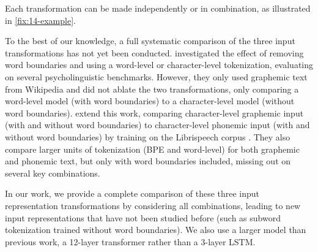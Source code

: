 \noindent
Each transformation can be made independently or in combination, as illustrated in \cref{fix:14-example}. %

To the best of our knowledge, a full systematic comparison of the three input transformations has not yet been conducted.  \citet{hahn-baroni-2019-tabula} investigated the effect of removing word boundaries and using a word-level or character-level tokenization, evaluating on several psycholinguistic benchmarks. However, they only used graphemic text from Wikipedia and did not ablate the two transformations, only comparing a word-level model (with word boundaries) to a character-level model (without word boundaries). \citet{nguyen-2022-word-boundaries} extend this work, comparing character-level graphemic input (with and without word boundaries) to character-level phonemic input (with and without word boundaries) by training on the Librispeech corpus \citep{panayotov2015librispeech}. They also compare larger units of tokenization (BPE and word-level) for both graphemic and phonemic text, but only with word boundaries included, missing out on several key combinations. 

In our work, we provide a complete comparison of these three input representation transformations by considering all combinations, leading to new input representations that have not been studied before (such as subword tokenization trained without word boundaries). We also use a larger model than previous work, a 12-layer transformer rather than a 3-layer LSTM.



